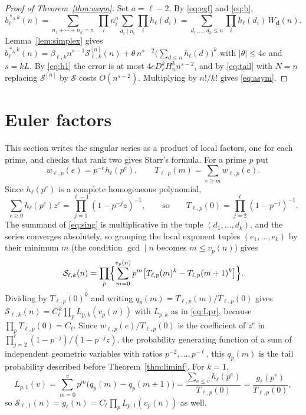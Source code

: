 \documentclass[11pt,a4paper]{article}
\theoremstyle{remark}
\numberwithin{equation}{section}
\newcommand{\Sing}{\mathcal S}
\newcommand{\Ac}{*_{\mathrm A}}
\begin{document}
\begin{proof}[Proof of Theorem~\ref{thm:asym}]
Set $a=\ell-2$. By \eqref{eq:egf} and \eqref{eq:b},
\[
b_\ell^{\Ac k}(n)=\sum_{n_1+\cdots+n_k=n}\ \prod_in_i^a\sum_{d_i\mid n_i}\prod_ih_\ell(d_i)=\sum_{d_1,\dots,d_k\le n}\prod_ih_\ell(d_i)\,W_{\mathbf d}(n).
\]
Lemma~\ref{lem:simplex} gives $b_\ell^{\Ac k}(n)=\beta_{\ell,k}n^{s-1}\Sing^{[n]}_{\ell,k}(n)+\theta\,n^{s-2}\bigl(\sum_{d\le n}h_\ell(d)\bigr)^k$ with $|\theta|\le4e$ and $s=kL$. By \eqref{eq:h1} the error is at most $4eD_\ell^kH_n^kn^{s-2}$, and by \eqref{eq:tail} with $N=n$ replacing $\Sing^{[n]}$ by $\Sing$ costs $O(n^{s-2})$. Multiplying by $n!/k!$ gives \eqref{eq:asym}.
\end{proof}

\section{Euler factors}\label{sec:euler}

This section writes the singular series as a product of local factors, one for each prime, and checks that rank two gives Starr's formula. For a prime $p$ put
\begin{equation}\label{eq:wT}
w_{\ell,p}(e)=p^{-e}h_\ell(p^e),\qquad T_{\ell,p}(m)=\sum_{e\ge m}w_{\ell,p}(e).
\end{equation}
Since $h_\ell(p^e)$ is a complete homogeneous polynomial,
\begin{equation}\label{eq:pgf}
\sum_{e\ge0}h_\ell(p^e)z^e=\prod_{j=1}^{\ell-1}(1-p^{-j}z)^{-1},\qquad\text{so}\qquad T_{\ell,p}(0)=\prod_{j=2}^{\ell}(1-p^{-j})^{-1}.
\end{equation}
The summand of \eqref{eq:sing} is multiplicative in the tuple $(d_1,\dots,d_k)$, and the series converges absolutely, so grouping the local exponent tuples $(e_1,\dots,e_k)$ by their minimum $m$ (the condition $\gcd\mid n$ becomes $m\le v_p(n)$) gives
\begin{equation}\label{eq:euler}
\Sing_{\ell,k}(n)=\prod_p\Bigl\{\sum_{m=0}^{v_p(n)}p^m\bigl[T_{\ell,p}(m)^k-T_{\ell,p}(m+1)^k\bigr]\Bigr\}.
\end{equation}
Dividing by $T_{\ell,p}(0)^k$ and writing $q_p(m)=T_{\ell,p}(m)/T_{\ell,p}(0)$ gives $\Sing_{\ell,k}(n)=C_\ell^{\,k}\prod_pL_{p,k}(v_p(n))$ with $L_{p,k}$ as in \eqref{eq:Lpr}, because $\prod_pT_{\ell,p}(0)=C_\ell$. Since $w_{\ell,p}(e)/T_{\ell,p}(0)$ is the coefficient of $z^e$ in $\prod_{j=2}^{\ell}(1-p^{-j})/(1-p^{-j}z)$, the probability generating function of a sum of independent geometric variables with ratios $p^{-2},\dots,p^{-\ell}$, this $q_p(m)$ is the tail probability described before Theorem~\ref{thm:liminf}. For $k=1$,
\begin{equation}\label{eq:L1}
L_{p,1}(v)=\sum_{m=0}^v p^m\bigl(q_p(m)-q_p(m+1)\bigr)=\frac{\sum_{e\le v}h_\ell(p^e)}{T_{\ell,p}(0)}=\frac{g_\ell(p^v)}{T_{\ell,p}(0)},
\end{equation}
so $\Sing_{\ell,1}(n)=g_\ell(n)=C_\ell\prod_pL_{p,1}(v_p(n))$ as well.
\end{document}
